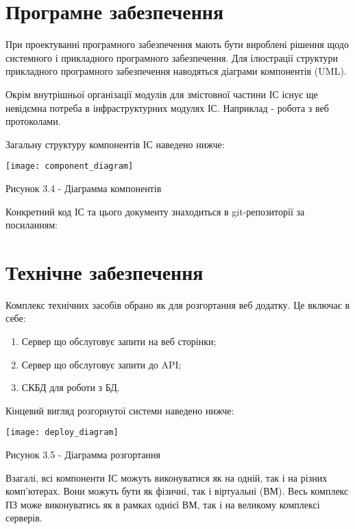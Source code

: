 \section{Програмне забезпечення}

При проектуванні програмного забезпечення мають бути вироблені рішення щодо системного і прикладного програмного забезпечення.
Для ілюстрації структури прикладного програмного забезпечення наводяться діаграми компонентів (UML).

Окрім внутрішньої організації модулів для змістовної частини ІС існує ще невідємна потреба в інфраструктурних модулях ІС. Наприклад -  робота з веб протоколами.

Загальну структуру компонентів ІС наведено нижче:

\begin{center}

\texttt{[image: component\_diagram]}

Рисунок 3.4 - Діаграмма компонентів
\end{center}

Конкретний код ІС та цього документу знаходиться в git-репозиторії за посиланням: \cite{repo}

\section{Технічне забезпечення}

Комплекс технічних засобів обрано як для розгортання веб додатку. Це включає в себе:

\begin{enumerate}

\item Сервер що обслуговує запити на веб сторінки;

\item Сервер що обслуговує запити до API;

\item СКБД для роботи з БД.

\end{enumerate}

Кінцевий вигляд розгорнутої системи наведено нижче:

\begin{center}

\texttt{[image: deploy\_diagram]}

Рисунок 3.5 - Діаграмма розгортання

\end{center}

Взагалі, всі компоненти ІС можуть виконуватися як на одній, так і на різних комп'ютерах.  Вони можуть бути як фізичні, так і віртуальні (ВМ). Весь комплекс ПЗ може виконуватись як в рамках однієї ВМ, так і на великому комплексі серверів.


